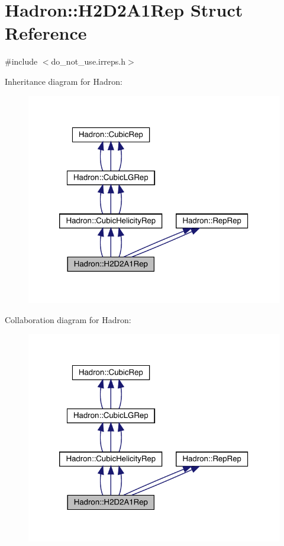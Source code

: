 \hypertarget{structHadron_1_1H2D2A1Rep}{}\section{Hadron\+:\+:H2\+D2\+A1\+Rep Struct Reference}
\label{structHadron_1_1H2D2A1Rep}


{\ttfamily \#include $<$do\+\_\+not\+\_\+use.\+irreps.\+h$>$}



Inheritance diagram for Hadron\+:
\nopagebreak
\begin{figure}[H]
\begin{center}
\leavevmode
\includegraphics[width=320pt]{d3/d14/structHadron_1_1H2D2A1Rep__inherit__graph}
\end{center}
\end{figure}


Collaboration diagram for Hadron\+:
\nopagebreak
\begin{figure}[H]
\begin{center}
\leavevmode
\includegraphics[width=320pt]{df/da7/structHadron_1_1H2D2A1Rep__coll__graph}
\end{center}
\end{figure}
